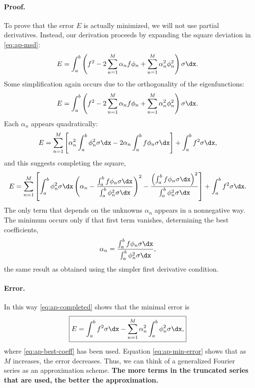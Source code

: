 \paragraph{Proof.}
To prove that the error $E$ is actually minimized, we will not use partial derivatives.  Instead, our derivation proceeds by expanding the square deviation in \eqref{eq:ap-msd}:
\begin{equation}
\label{eq:ap-expand1}
E = \int_a^b \left(f^2 - 2\sum_{n=1}^M \alpha_n f\phi_n + \sum_{n=1}^M \alpha_n^2\phi_n^2\right)\sigma\dx.
\end{equation}
Some simplification again occurs due to the orthogonality of the eigenfunctions:
\begin{equation}
\label{eq:ap-expand2}
E = \int_a^b \left(f^2 - 2\sum_{n=1}^M \alpha_n f\phi_n + \sum_{n=1}^M \alpha_n^2\phi_n^2\right)\sigma\dx.
\end{equation}
Each $\alpha_n$ appears quadratically:
\begin{equation}
\label{eq:ap-quadratic}
E = \sum_{n=1}^M \left[\alpha_n^2\int_a^b \phi_n^2\sigma\dx - 2\alpha_n\int_a^b f\phi_n\sigma\dx\right] + \int_a^b f^2\sigma\dx,
\end{equation}
and this suggests completing the square,
\begin{equation}
\label{eq:ap-completed}
E = \sum_{n=1}^M \left[\int_a^b \phi_n^2\sigma\dx \left(\alpha_n - \frac{\int_a^b f\phi_n\sigma\dx}{\int_a^b \phi_n^2\sigma\dx}\right)^2 - \frac{\left(\int_a^b f\phi_n\sigma\dx\right)^2}{\int_a^b \phi_n^2\sigma\dx}\right] + \int_a^b f^2\sigma\dx.
\end{equation}
The only term that depends on the unknowns $\alpha_n$ appears in a nonnegative way.  The minimum occurs only if that first term vanishes, determining the best coefficients,
\begin{equation}
\label{eq:ap-best-coeff}
\alpha_n = \frac{\int_a^b f\phi_n\sigma\dx}{\int_a^b \phi_n^2\sigma\dx},
\end{equation}
the same result as obtained using the simpler first derivative condition.

\paragraph{Error.}
In this way \eqref{eq:ap-completed} shows that the minimal error is
\begin{equation}
\label{eq:ap-min-error}
\boxed{E = \int_a^b f^2\sigma\dx - \sum_{n=1}^M \alpha_n^2\int_a^b \phi_n^2\sigma\dx,}
\end{equation}
where \eqref{eq:ap-best-coeff} has been used.  Equation \eqref{eq:ap-min-error} shows that as $M$ increases, the error decreases.  Thus, we can think of a generalized Fourier series as an approximation scheme.  \textbf{The more terms in the truncated series that are used, the better the approximation.}

